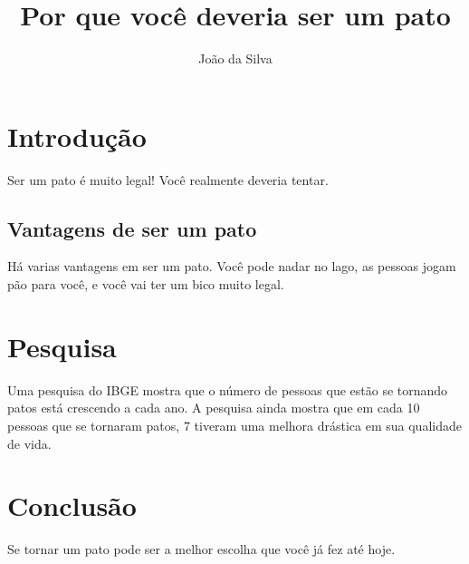 \documentclass[12pt, a4paper]{article}
\title{Por que você deveria ser um pato}
\author{João da Silva}
\date{}
\begin{document}
  \maketitle

  \section{Introdução}

  Ser um pato é muito legal! Você realmente deveria tentar.

    \subsection{Vantagens de ser um pato}

    Há varias vantagens em ser um pato. Você pode nadar no lago, as pessoas jogam pão para você, e você vai ter um bico muito legal.

  \section{Pesquisa}

  Uma pesquisa do IBGE mostra que o número de pessoas que estão se tornando patos está crescendo a cada ano. A pesquisa ainda mostra que em cada 10 pessoas que se tornaram patos, 7 tiveram uma melhora drástica em sua qualidade de vida.

  \section{Conclusão}

  Se tornar um pato pode ser a melhor escolha que você já fez até hoje.
\end{document}
